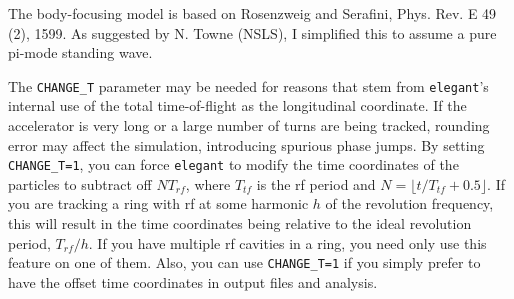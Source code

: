 The body-focusing model is based on Rosenzweig and Serafini, Phys. Rev. E 49 (2),
1599.  As suggested by N. Towne (NSLS), I simplified this to assume a pure pi-mode
standing wave.

The \verb|CHANGE_T| parameter may be needed for reasons that stem from
{\tt elegant}'s internal use of the total time-of-flight as the
longitudinal coordinate.  If the accelerator is very long or a large
number of turns are being tracked, rounding error may affect the
simulation, introducing spurious phase jumps.  By setting
\verb|CHANGE_T=1|, you can force {\tt elegant} to modify the time
coordinates of the particles to subtract off $N T_{rf}$, where
$T_{tf}$ is the rf period and $N = \lfloor t/T_{tf}+0.5\rfloor$.  If
you are tracking a ring with rf at some harmonic $h$ of the revolution
frequency, this will result in the time coordinates being relative to
the ideal revolution period, $T_{rf}/h$.  If you have multiple rf
cavities in a ring, you need only use this feature on one of them.
Also, you can use \verb|CHANGE_T=1| if you simply prefer to have the
offset time coordinates in output files and analysis.
